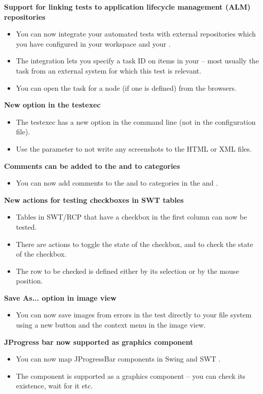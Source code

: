 \textbf{Support for linking tests to application lifecycle management (ALM) repositories}
\begin{itemize}
\item You can now integrate your automated tests with external repositories which you have configured in your workspace and your \gdproject{}.
\item The integration lets you specify a task ID on items in your \gdproject{} -- most usually the task from an external system for which this test is relevant. 
\item You can open the task for a node (if one is defined) from the browsers.  
\end{itemize}

\textbf{New option in the testexec}
\begin{itemize}
\item The testexec has a new option in the command line (not in the configuration file).
\item Use the parameter  to not write any screenshots to the HTML or XML files.
\end{itemize}

\textbf{Comments can be added to the \gdproject{} and to categories}
\begin{itemize}
\item You can now add comments to the \gdproject{} and to categories in the \gdtestsuitebrowser{} and \gdtestcasebrowser{}.
\end{itemize}

\textbf{New actions for testing checkboxes in SWT tables}
\begin{itemize}
\item Tables in SWT/RCP \gdauts{} that have a checkbox in the first column can now be tested.
\item There are actions to toggle the state of the checkbox, and to check the state of the checkbox.
\item The row to be checked is defined either by its selection or by the mouse position.
\end{itemize}

\textbf{Save As... option in image view}
\begin{itemize}
\item You can now save images from errors in the test directly to your file system  using a new button and the context menu in the image view.
\end{itemize}

\textbf{JProgress bar now supported as graphics component}
\begin{itemize}
\item You can now map JProgressBar components in Swing and SWT \gdauts{}.
\item The component is supported as a graphics component -- you can check its existence, wait for it etc.
\end{itemize}

